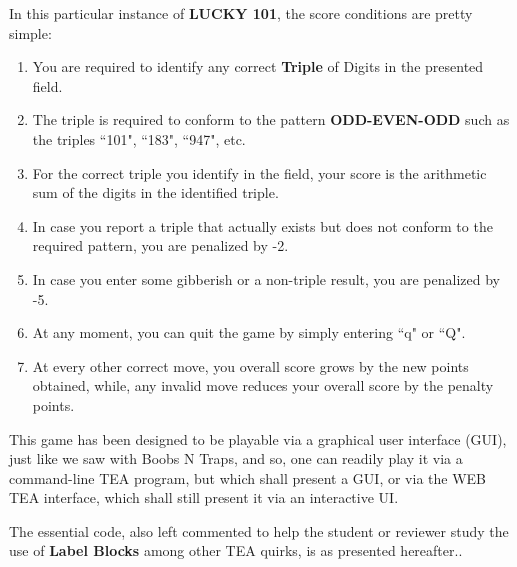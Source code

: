 \documentclass[a4paper, 18pt]{book} %
\begin{document}
\vspace{2em}

In this particular instance of \textbf{LUCKY 101}, the score conditions are pretty simple:

\begin{enumerate}
\item You are required to identify any correct \textbf{Triple} of Digits in the presented field.
\item The triple is required to conform to the pattern \textbf{ODD-EVEN-ODD} such as the triples ``101", ``183", ``947", etc.
\item For the correct triple you identify in the field, your score is the arithmetic sum of the digits in the identified triple.
\item In case you report a triple that actually exists but does not conform to the required pattern, you are penalized by -2.
\item In case you enter some gibberish or a non-triple result, you are penalized by -5.
\item At any moment, you can quit the game by simply entering ``q" or ``Q".
\item At every other correct move, you overall score grows by the new points obtained, while, any invalid move reduces your overall score by the penalty points.
\end{enumerate}


\vspace{2em}


This game has been designed to be playable via a graphical user interface (GUI), just like we saw with Boobs N Traps, and so, one can readily play it via a command-line TEA program, but which shall present a GUI, or via the WEB TEA interface, which shall still present it via an interactive UI.

\vspace{2em}


The essential code, also left commented to help the student or reviewer study the use of \textbf{Label Blocks} among other TEA quirks, is as presented hereafter..
\end{document}
